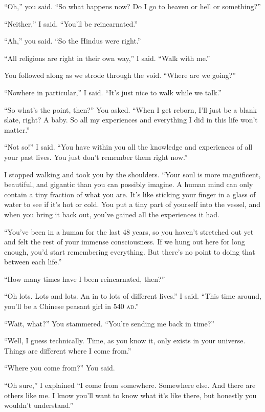 \enquote{Oh,} you said. \enquote{So what happens now? Do I go to heaven or hell or something?}

\enquote{Neither,} I said. \enquote{You'll be reincarnated.}

\enquote{Ah,} you said. \enquote{So the Hindus were right.}

\enquote{All religions are right in their own way,} I said. \enquote{Walk with me.}

You followed along as we strode through the void. \enquote{Where are we going?}

\enquote{Nowhere in particular,} I said. \enquote{It's just nice to walk while we talk.}

\enquote{So what's the point, then?} You asked. \enquote{When I get reborn, I'll just be a blank slate, right? A baby. So all my experiences and everything I did in this life won't matter.}

\enquote{Not so!} I said. \enquote{You have within you all the knowledge and experiences of all your past lives. You just don't remember them right now.}

I stopped walking and took you by the shoulders. “Your soul is more magnificent, beautiful, and gigantic than you can possibly imagine. A human mind can only contain a tiny fraction of what you are. It's like sticking your finger in a glass of water to see if it's hot or cold. You put a tiny part of yourself into the vessel, and when you bring it back out, you've gained all the experiences it had.

\enquote{You've been in a human for the last 48 years, so you haven't stretched out yet and felt the rest of your immense consciousness. If we hung out here for long enough, you'd start remembering everything. But there's no point to doing that between each life.}

\enquote{How many times have I been reincarnated, then?}

\enquote{Oh lots. Lots and lots. An in to lots of different lives.} I said. \enquote{This time around, you'll be a Chinese peasant girl in 540 \textsc{ad}.}

\enquote{Wait, what?} You stammered. \enquote{You're sending me back in time?}

\enquote{Well, I guess technically. Time, as you know it, only exists in your universe. Things are different where I come from.}

\enquote{Where you come from?} You said.

\enquote{Oh sure,} I explained \enquote{I come from somewhere. Somewhere else. And there are others like me. I know you'll want to know what it's like there, but honestly you wouldn't understand.}

